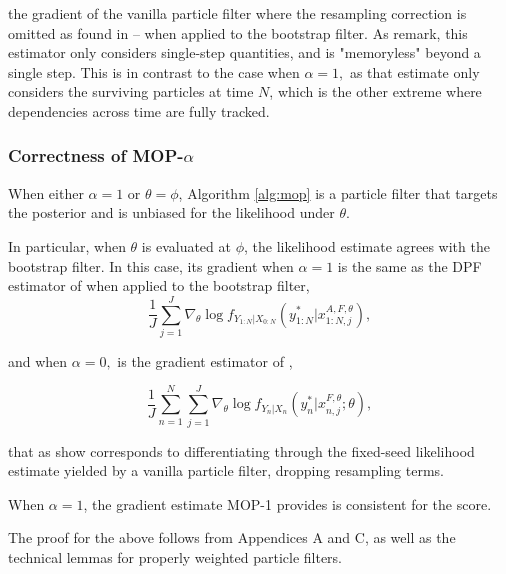\documentclass{article}
\begin{document}
the gradient of the vanilla particle filter where the resampling correction is omitted as found in \cite{blei2018vsmc} -- when applied to the bootstrap filter. As \cite{scibior2021dpf} remark, this estimator only considers single-step quantities, and is "memoryless" beyond a single step. This is in contrast to the case when $\alpha=1,$ as that estimate only considers the surviving particles at time $N$, which is the other extreme where dependencies across time are fully tracked. 



\subsubsection{Correctness of MOP-$\alpha$}

\begin{prop}
    \label{prop:mop-correctness}
    When either $\alpha=1$ or $\theta=\phi$, Algorithm \ref{alg:mop} is a particle filter that targets the posterior and is unbiased for the likelihood under $\theta$. 
    
    In particular, when $\theta$ is evaluated at $\phi$, the likelihood estimate agrees with the bootstrap filter. In this case, its gradient when $\alpha=1$ is the same as the DPF estimator of \citet{scibior21} when applied to the bootstrap filter,
    \begin{equation}
        \frac{1}{J}\sum_{j=1}^J \nabla_\theta \log f_{Y_{1:N}|X_{0:N}}(y_{1:N}^* | x_{1:N,j}^{A, F,\theta}),
    \end{equation}

    and when $\alpha=0,$ is the gradient estimator of \cite{blei2018vsmc},

    \begin{equation}
        \frac{1}{J} \sum_{n=1}^N \sum_{j=1}^J \nabla_\theta \log f_{Y_n|X_{n}}(y_n^*|x_{n,j}^{F, \theta}; \theta),
    \end{equation}

    that as \cite{scibior21} show corresponds to differentiating through the fixed-seed likelihood estimate yielded by a vanilla particle filter, dropping resampling terms.

    When $\alpha=1$, the gradient estimate MOP-1 provides is consistent for the score.
\end{prop}

The proof for the above follows from Appendices A and C, as well as the technical lemmas for properly weighted particle filters. 
\end{document}
